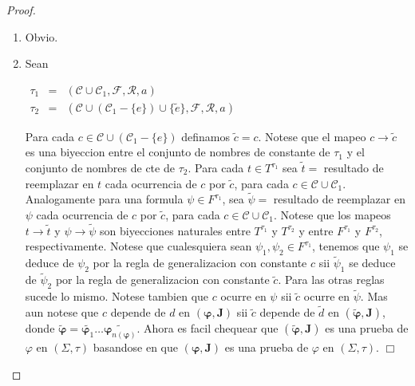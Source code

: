   \begin{proof}
    \begin{enumerate}
      \item Obvio.
      \item Sean

      $\displaystyle \begin{array}{rcl} \tau _{1} & =& (\mathcal{C}\cup \mathcal{C}_{1},\mathcal{F},\mathcal{R},a) \\ \tau _{2} & =& (\mathcal{C}\cup (\mathcal{C}_{1}-\{e\})\cup \{\tilde{e}\}, \mathcal{F},\mathcal{R},a) \end{array} $

      Para cada $c\in \mathcal{C}\cup (\mathcal{C}_{1}-\{e\})$ definamos $\tilde{c} =c$. Notese que el mapeo $c\rightarrow \tilde{c}$ es una biyeccion entre el conjunto de nombres de constante de $\tau _{1}$ y el conjunto de nombres de cte de $\tau _{2}$. Para cada $t\in T^{\tau _{1}}$ sea $\tilde{t}=$ resultado de reemplazar en $t$ cada ocurrencia de $c$ por $\tilde{c}$, para cada $c\in \mathcal{C}\cup \mathcal{C}_{1}$. Analogamente para una formula $ \psi \in F^{\tau _{1}}$, sea $\tilde{\psi}=$ resultado de reemplazar en $ \psi $ cada ocurrencia de $c$ por $\tilde{c}$, para cada $c\in \mathcal{C} \cup \mathcal{C}_{1}$. Notese que los mapeos $t\rightarrow \tilde{t}$ y $ \psi \rightarrow \tilde{\psi}$ son biyecciones naturales entre $T^{\tau _{1}} $ y $T^{\tau _{2}}$ y entre $F^{\tau _{1}}$ y $F^{\tau _{2}}$, respectivamente. Notese que cualesquiera sean $\psi_{1},\psi_{2}\in F^{\tau _{1}}$, tenemos que $\psi_{1}$ se deduce de $\psi_{2}$ por la regla de generalizacion con constante $c$ sii $\tilde{\psi}_{1}$ se deduce de $\tilde{\psi}_{2}$ por la regla de generalizacion con constante $\tilde{c} $. Para las otras reglas sucede lo mismo. Notese tambien que $c$ ocurre en $ \psi $ sii $\tilde{c}$ ocurre en $\tilde{\psi}.$ Mas aun notese que $c$ depende de $d$ en $(\mathbf{\varphi },\mathbf{J})$ sii $\tilde{c}$ depende de $\tilde{d}$ en $(\mathbf{\tilde{\varphi}},\mathbf{J})$, donde $\mathbf{ \tilde{\varphi}}=\widetilde{\mathbf{\varphi }_{1}}\dotsc\widetilde{\mathbf{ \varphi }_{n(\mathbf{\varphi })}}$. Ahora es facil chequear que $(\mathbf{ \tilde{\varphi}},\mathbf{J})$ es una prueba de $\varphi$ en $(\Sigma, \tau) $ basandose en que $(\mathbf{\varphi },\mathbf{J})$ es una prueba de $\varphi$ en $(\Sigma, \tau)$. $\Box$
    \end{enumerate}
  \end{proof}

